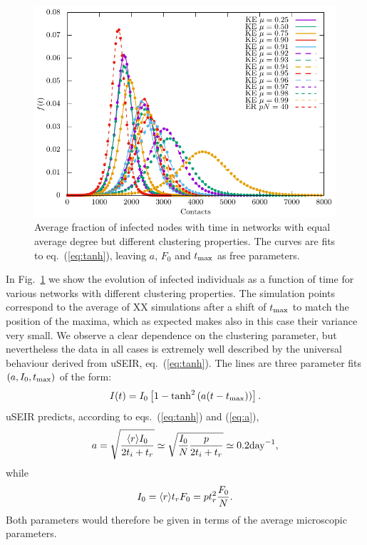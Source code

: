 \documentclass[a4paper,oneside,11pt]{article}
\begin{document}
\begin{figure}[htbp]
\centering
 \includegraphics[width=.8\linewidth]{uSEIR.pdf}
\caption{Average fraction of infected nodes with time in networks with equal average degree but different clustering properties. The curves are fits  to eq.~(\ref{eq:tanh}), leaving $a$, $F_0$ and $t_{\rm max}$ as free parameters. }
\label{fig:net}
\end{figure}
In Fig.~\ref{fig:net} we show the evolution of infected individuals as a function of time for various networks with different clustering properties. The simulation points correspond to the average of XX simulations after a shift of $t_{\rm max}$ to match the position of the maxima, which as expected makes also in this case their variance very  small. We observe a clear dependence on the clustering parameter, but nevertheless the data in all cases is extremely well described by  the universal behaviour  derived from uSEIR, eq.~(\ref{eq:tanh}). The lines
are three parameter fits $(a, I_0, t_{\rm max})$ of the form:
\begin{eqnarray}
I(t)= I_0 \left[ 1 - {\rm tanh}^2 \left(a (t-t_{\rm max}) \right)\right].
\label{eq:iasym}
\end{eqnarray}
uSEIR predicts, according to eqs.~(\ref{eq:tanh}) and (\ref{eq:a}),
\begin{eqnarray}
a=  \sqrt{{\langle r\rangle I_0\over 2 t_i + t_r}} \simeq \sqrt{{I_0\over N} { p \over  2 t_i + t_r}} \simeq 0.2 {\rm day}^{-1},
\end{eqnarray}
while 
\begin{eqnarray}
 I_0 = \langle r \rangle t_r F_0 = p t^2_r {F_0\over N}.
 \end{eqnarray}
 Both parameters would therefore be given in terms of the average microscopic parameters. 
\end{document}
